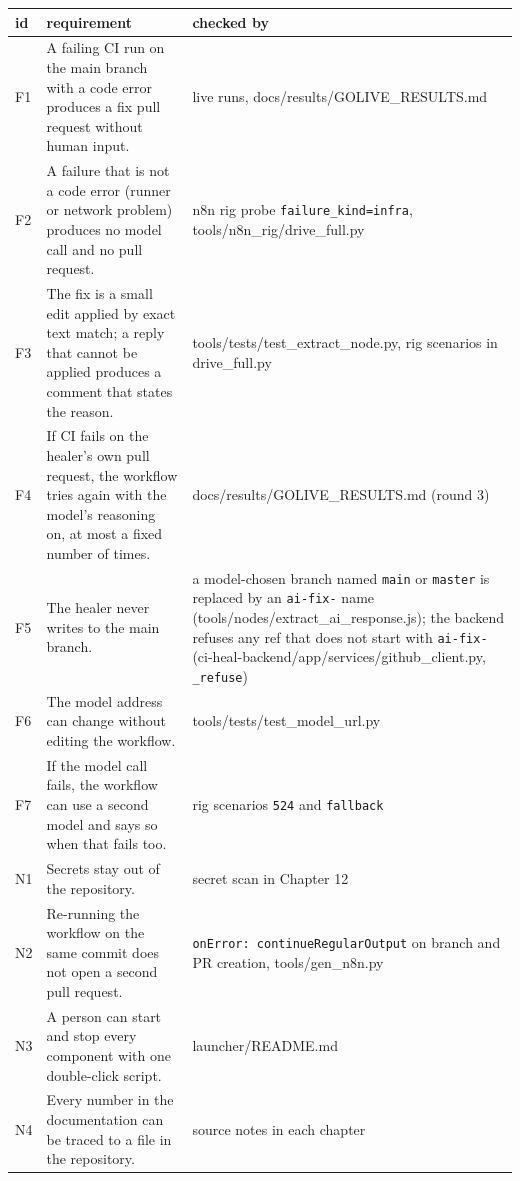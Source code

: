 \documentclass[11pt,a4paper]{report}
\begin{document}
\begin{longtable}{>{\raggedright\arraybackslash}p{0.032\dimexpr\linewidth-6\tabcolsep\relax}>{\raggedright\arraybackslash}p{0.484\dimexpr\linewidth-6\tabcolsep\relax}>{\raggedright\arraybackslash}p{0.484\dimexpr\linewidth-6\tabcolsep\relax}}
\toprule
\textbf{id} & \textbf{requirement} & \textbf{checked by} \\
\midrule
\endhead
F1 & A failing CI run on the main branch with a code error produces a fix pull request without human input. & live runs, docs/results/GOLIVE\_RESULTS.md \\
F2 & A failure that is not a code error (runner or network problem) produces no model call and no pull request. & n8n rig probe \texttt{failure\_\allowbreak{}kind=infra}, tools/n8n\_rig/drive\_full.py \\
F3 & The fix is a small edit applied by exact text match; a reply that cannot be applied produces a comment that states the reason. & tools/tests/test\_extract\_node.py, rig scenarios in drive\_full.py \\
F4 & If CI fails on the healer's own pull request, the workflow tries again with the model's reasoning on, at most a fixed number of times. & docs/results/GOLIVE\_RESULTS.md (round 3) \\
F5 & The healer never writes to the main branch. & a model-chosen branch named \texttt{main} or \texttt{master} is replaced by an \texttt{ai-\allowbreak{}fix-\allowbreak{}} name (tools/nodes/extract\_ai\_response.js); the backend refuses any ref that does not start with \texttt{ai-\allowbreak{}fix-\allowbreak{}} (ci-heal-backend/app/services/github\_client.py, \texttt{\_\allowbreak{}refuse}) \\
F6 & The model address can change without editing the workflow. & tools/tests/test\_model\_url.py \\
F7 & If the model call fails, the workflow can use a second model and says so when that fails too. & rig scenarios \texttt{524} and \texttt{fallback} \\
N1 & Secrets stay out of the repository. & secret scan in Chapter 12 \\
N2 & Re-running the workflow on the same commit does not open a second pull request. & \texttt{onError: continueRegularOutput} on branch and PR creation, tools/gen\_n8n.py \\
N3 & A person can start and stop every component with one double-click script. & launcher/README.md \\
N4 & Every number in the documentation can be traced to a file in the repository. & source notes in each chapter \\
\bottomrule
\end{longtable}
\end{document}
